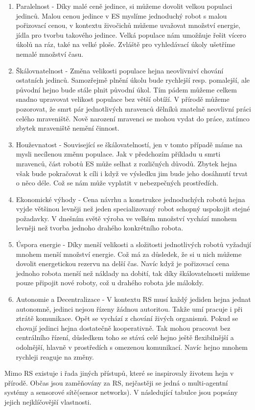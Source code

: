     \begin{enumerate}
        \item Paralelnost - Díky malé ceně jedince, si můžeme dovolit velkou populaci jedinců. Malou cenou jedince v ES myslíme jednoduchý robot s malou pořizovací cenou, v kontextu živočichů můžeme uvažovat množství energie, jídla pro tvorbu takového jedince. Velká populace nám umožňuje řešit vícero úkolů na ráz, také na velké ploše. Zvláště pro vyhledávací úkoly ušetříme nemalé množství času. 
        \item Škálovnatelnost - Změna velikosti populace hejna neovlivniví chování ostatních jedinců. Samozřejmě plnění úkolu bude rychlejší resp. pomalejší, ale původní hejno bude stále plnit původní úkol. Tím pádem můžeme celkem snadno upravovat velikost populace bez větší obtíží. V přírodě můžeme pozorovat, že smrt pár jednotlivých mravenců dělníků znatelně neovlivní práci celého mraveniště. Nově narození mravenci se mohou vydat do práce, zatímco zbytek mraveniště nemění činnost. 
        \item Houževnatost - Související se škálovatelností, jen v tomto případě máme na mysli necílenou změnu populace. Jak v předchozím příkladu u smrti mravenců, část robotů ES může selhat z rozličných důvodů. Zbytek hejna však bude pokračovat k cíli i když ve výsledku jim bude jeho dosáhnutí trvat o něco déle. Což se nám může vyplatit v nebezpečných prostředích. 
        \item Ekonomické výhody - Cena návrhu a konstrukce jednoduchých robotů hejna vyjde většinou levněji než jeden specializovaný robot schopný uspokojit stejné požadavky. V dnešním světě výroba ve velkém množství  vychází mnohem levněji než tvorba jednoho drahého konkrétního robota.
        \item Úspora energie - Díky menší velikosti a složitosti jednotlivých robotů vyžadují mnohem menší množství energie. Což má za důsledek, že si u nich můžeme dovolit energetickou rezervu na delší čas. Navíc když je pořizovací cena jednoho robota menší než náklady na dobití, tak díky škálovatelnosti můžeme pouze připojit nové roboty, což u drahého robota jde málokdy. 
        \item Autonomie a Decentralizace - V kontextu RS musí každý jediden hejna jednat autonomně, jedinci nejsou řízeny žádnou autoritou. Takže umí pracuje i při ztrátě komunikace. Opět se vychází z chování živých organismů. Pokud se chovají jedinci hejna dostatečně kooperativně. Tak mohou pracovat bez centrálního řízení, důsledkem toho se stává celé hejno ještě flexibilnější a odolnější, hlavně v prostředích s omezenou komunikací. Navíc hejno mnohem rychleji reaguje na změny. 
    \end{enumerate}
\par 
Mimo RS existuje i řada jiných přístupů, které se inspirovaly životem hejn v přírodě. Občas jsou zaměňovány za RS, nejčastěji se jedná o multi-agentní systémy a sensorové sítě(sensor networks). V následující tabulce jsou popsány jejich nejklíčovější vlastnosti. 
\newpage
